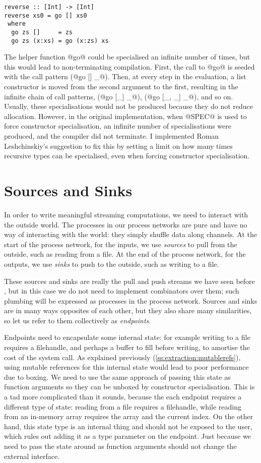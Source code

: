 \begin{lstlisting}
reverse :: [Int] -> [Int]
reverse xs0 = go [] xs0
 where
  go zs []     = zs
  go zs (x:xs) = go (x:zs) xs
\end{lstlisting}

The helper function @go@ could be specialised an infinite number of times, but this would lead to non-terminating compilation.
First, the call to @go@ is seeded with the call pattern (@go [] _@).
Then, at every step in the evaluation, a list constructor is moved from the second argument to the first, resulting in the infinite chain of call patterns, (@go [_] _@), (@go [_, _] _@), and so on.
Usually, these specialisations would not be produced because they do not reduce allocation.
However, in the original implementation, when @SPEC@ is used to force constructor specialisation, an infinite number of specialisations were produced, and the compiler did not terminate.
I implemented Roman Leshchinskiy's suggestion to fix this by setting a limit on how many times recursive types can be specialised, even when forcing constructor specialisation.

\section{Sources and Sinks}
In order to write meaningful streaming computations, we need to interact with the outside world.
The processes in our process networks are pure and have no way of interacting with the world: they simply shuffle data along channels.
At the start of the process network, for the inputs, we use \emph{sources} to pull from the outside, such as reading from a file.
At the end of the process network, for the outputs, we use \emph{sinks} to push to the outside, such as writing to a file.

These sources and sinks are really the pull and push streams we have seen before , but in this case we do not need to implement combinators over them; such plumbing will be expressed as processes in the process network.
Sources and sinks are in many ways opposites of each other, but they also share many similarities, so let us refer to them collectively as \emph{endpoints}.

Endpoints need to encapsulate some internal state: for example writing to a file requires a filehandle, and perhaps a buffer to fill before writing, to amortise the cost of the system call.
As explained previously (\autoref{ss:extraction:mutablerefs}), using mutable references for this internal state would lead to poor performance due to boxing.
We need to use the same approach of passing this state as function arguments so they can be unboxed by constructor specialisation.
This is a tad more complicated than it sounds, because the each endpoint requires a different type of state: reading from a file requires a filehandle, while reading from an in-memory array requires the array and the current index.
On the other hand, this state type is an internal thing and should not be exposed to the user, which rules out adding it as a type parameter on the endpoint.
Just because we need to pass the state around as function arguments should not change the external interface.

